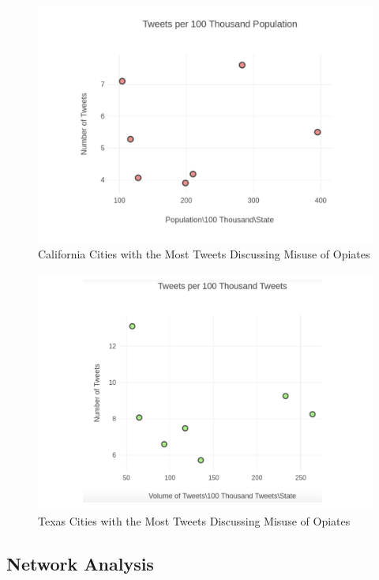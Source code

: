 \documentclass[sigconf]{acmart}
\begin{document}
\begin{figure}[!ht]
  \centering\includegraphics[width=\columnwidth]{images/Figure5.pdf}
  \caption{California Cities with the Most Tweets Discussing 
  Misuse of Opiates}
  \label{f:Figure5}
\end{figure}

\begin{figure}[!ht]
  \centering\includegraphics[width=\columnwidth]{images/Figure6.pdf}
  \caption{Texas Cities with the Most Tweets Discussing Misuse of Opiates}
  \label{f:Figure6}
\end{figure}



\subsection{Network Analysis} 
\end{document}
